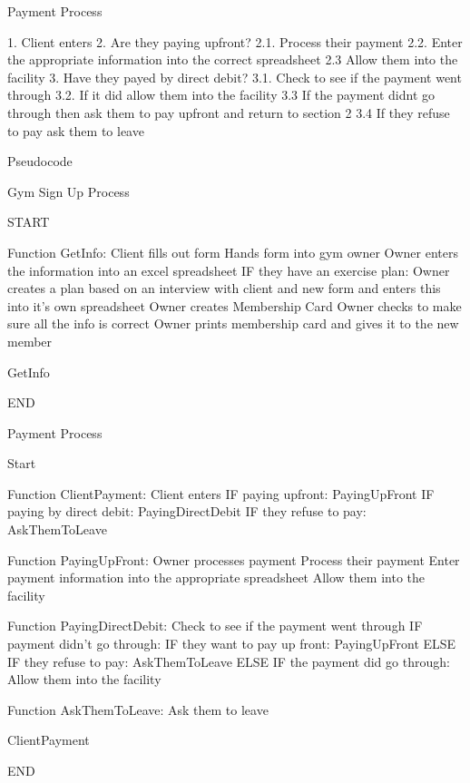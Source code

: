 Payment Process
\begin{python}
1. Client enters
2. Are they paying upfront?
2.1. Process their payment
2.2. Enter the appropriate information into the correct spreadsheet
2.3 Allow them into the facility
3. Have they payed by direct debit?
3.1. Check to see if the payment went through
3.2. If it did allow them into the facility
3.3 If the payment didnt go through then ask them to pay upfront and return to section 2
3.4 If they refuse to pay ask them to leave
\end{python}

Pseudocode


Gym Sign Up Process

\begin{python}

START

Function GetInfo:
	Client fills out form
	Hands form into gym owner
	Owner enters the information into an excel spreadsheet
	IF they have an exercise plan:
		Owner creates a plan based on an interview with client and new form and enters this into it’s
own spreadsheet
	Owner creates Membership Card
	Owner checks to make sure all the info is correct
	Owner prints membership card and gives it to the new member

GetInfo

END

\end{python}

Payment Process

\begin{python}
Start

Function ClientPayment:
	Client enters
	IF paying upfront:
		PayingUpFront
	IF paying by direct debit:
		PayingDirectDebit
	IF they refuse to pay:
		AskThemToLeave

Function PayingUpFront:
	Owner processes payment
	Process their payment
	Enter payment information into the appropriate spreadsheet
	Allow them into the facility

Function PayingDirectDebit:
	Check to see if the payment went through
	IF payment didn’t go through:
		IF they want to pay up front:
			PayingUpFront
		ELSE IF they refuse to pay:
			AskThemToLeave
	ELSE IF the payment did go through:
		Allow them into the facility

Function AskThemToLeave:
	Ask them to leave

ClientPayment 

END
\end{python}

